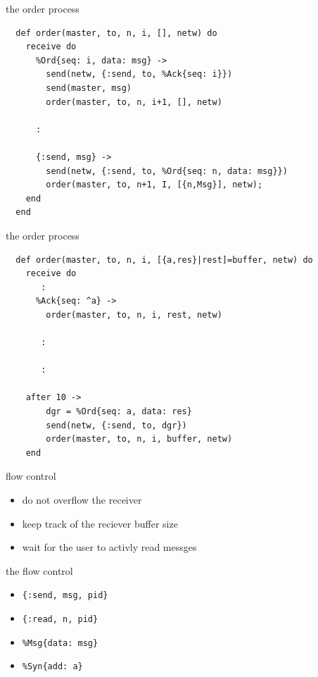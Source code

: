 \begin{frame}[fragile]{the order process}

\begin{verbatim}
  def order(master, to, n, i, [], netw) do
    receive do
      %Ord{seq: i, data: msg} ->
        send(netw, {:send, to, %Ack{seq: i}})
        send(master, msg)
        order(master, to, n, i+1, [], netw)
        
      :
         
      {:send, msg} ->
        send(netw, {:send, to, %Ord{seq: n, data: msg}})
        order(master, to, n+1, I, [{n,Msg}], netw);
    end
  end
\end{verbatim}
  
\end{frame}

\begin{frame}[fragile]{the order process}

\begin{verbatim}
  def order(master, to, n, i, [{a,res}|rest]=buffer, netw) do
    receive do
       :
      %Ack{seq: ^a} ->
        order(master, to, n, i, rest, netw)

       :

       :
                
    after 10 ->
        dgr = %Ord{seq: a, data: res}
        send(netw, {:send, to, dgr})
        order(master, to, n, i, buffer, netw)
    end
\end{verbatim}
\end{frame}

\begin{frame}{flow control}

 \begin{itemize}
  \item do not overflow the receiver \pause
  \item keep track of the reciever buffer size  \pause
  \item wait for the user to activly read messges \pause
\end{itemize}

\vspace{20pt}{\em We are introducing a synchronous interface - only send if receiver prepared.}

\end{frame}

\begin{frame}{the flow control}

  \begin{itemize}
  \item {\tt \{:send, msg, pid\}} 

  \item {\tt \{:read, n, pid\}} 


  \item {\tt \%Msg\{data: msg\}}

  \item {\tt \%Syn\{add: a\}}

      
\end{itemize}
  
\end{frame}

